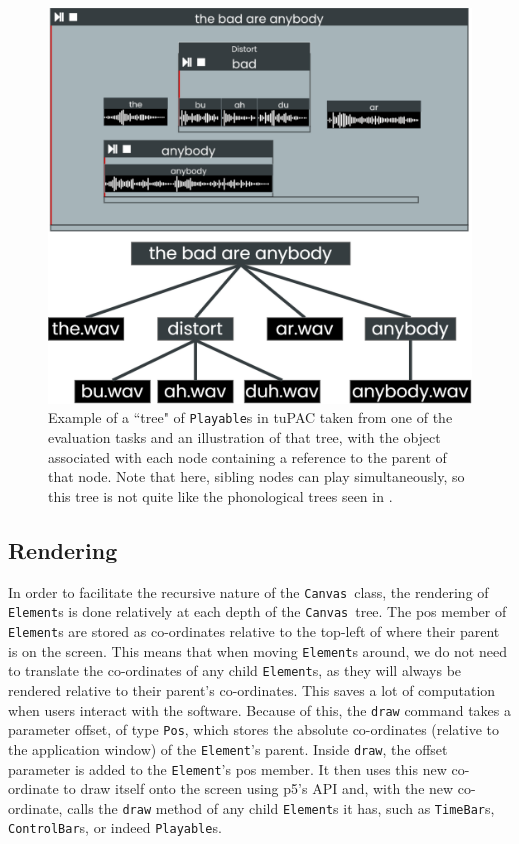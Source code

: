 \documentclass[12pt,a4paper,oneside,openright]{report}
\newcommand{\element}{\texttt{Element}}
\newcommand{\pos}{\texttt{Pos}}
\newcommand{\canvas}{\texttt{Canvas}}
\newcommand{\controlbar}{\texttt{ControlBar}}
\newcommand{\timebar}{\texttt{TimeBar}}
\newcommand{\playable}{\texttt{Playable}}
\begin{document}
\begin{figure}[h!]
    \centering
    \includegraphics[scale=0.3]{images/canvas_tree.png}
    \caption{Example of a ``tree" of \playable s in tuPAC taken from one of the evaluation tasks and an illustration of that tree, with the object associated with each node containing a reference to the parent of that node. Note that here, sibling nodes can play simultaneously, so this tree is not quite like the phonological trees seen in \protect\footnotemark[4]. }
    \label{fig:canvas_tree}
\end{figure}

\subsection{Rendering}
In order to facilitate the recursive nature of the \canvas\ class, the rendering of \element s is done relatively at each depth of the \canvas\ tree. The pos member of \element s are stored as co-ordinates relative to the top-left of where their parent is on the screen. This means that when moving \element s around, we do not need to translate the co-ordinates of any child \element s, as they will always be rendered relative to their parent's co-ordinates. This saves a lot of computation when users interact with the software. Because of this, the \verb|draw| command takes a parameter offset, of type \pos, which stores the absolute co-ordinates (relative to the application window) of the \element's parent. Inside \verb|draw|, the offset parameter is added to the \element's pos member. It then uses this new co-ordinate to draw itself onto the screen using p5's API and, with the new co-ordinate, calls the \verb|draw| method of any child \element s it has, such as \timebar s, \controlbar s, or indeed \playable s.
\end{document}
